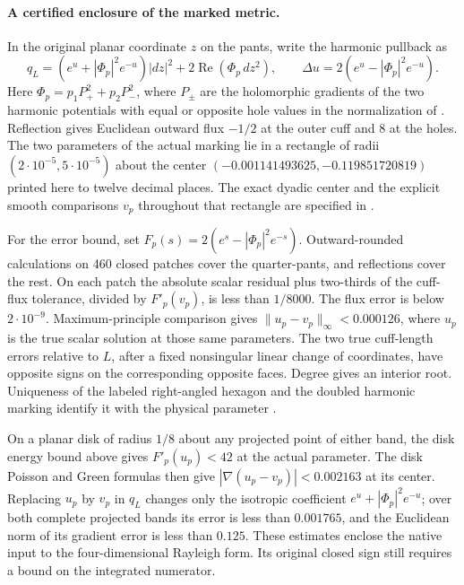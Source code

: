 \documentclass[11pt,letterpaper]{article}
\numberwithin{equation}{section}
\begin{document}
\paragraph{A certified enclosure of the marked metric.}
In the original planar coordinate \(z\) on the pants, write the
harmonic pullback as
\[
 q_L=(e^u+|\Phi_p|^2e^{-u})|dz|^2+2\operatorname{Re}(\Phi_p\,dz^2),
 \qquad \Delta u=2(e^u-|\Phi_p|^2e^{-u}).
\]
Here \(\Phi_p=p_1P_+^2+p_2P_-^2\), where \(P_\pm\) are the
holomorphic gradients of the two harmonic potentials with equal or
opposite hole values in the normalization of
\cite{Baker2026NativeMarking}. Reflection gives Euclidean outward
flux \(-1/2\) at the outer cuff and \(8\) at the holes.
The two parameters of the actual marking lie in a rectangle of
radii \((2\cdot10^{-5},5\cdot10^{-5})\) about the center
\((-0.001141493625,-0.119851720819)\) printed here to twelve decimal
places. The exact dyadic center and the explicit smooth comparisons
\(v_p\) throughout that rectangle are specified in
\cite{Baker2026NativeMarking}.

For the error bound, set \(F_p(s)=2(e^s-|\Phi_p|^2e^{-s})\).
Outward-rounded calculations on 460 closed patches cover the
quarter-pants, and reflections cover the rest. On each patch the
absolute scalar residual plus two-thirds of the cuff-flux tolerance,
divided by \(F'_p(v_p)\), is less than \(1/8000\). The flux error is
below \(2\cdot10^{-9}\). Maximum-principle comparison gives
\(\|u_p-v_p\|_\infty<0.000126\), where \(u_p\) is the true scalar
solution at those same parameters. The two true cuff-length errors
relative to \(L\), after a fixed nonsingular linear change of
coordinates, have opposite signs on the corresponding opposite faces.
Degree gives an interior root. Uniqueness of the labeled
right-angled hexagon and the doubled harmonic marking identify it
with the physical parameter \cite{Baker2026NativeMarking}.

On a planar disk of radius \(1/8\) about any projected point of
either band, the disk energy bound above gives \(F'_p(u_p)<42\)
at the actual parameter. The disk Poisson and Green formulas then
give \(|\nabla(u_p-v_p)|<0.002163\) at its center. Replacing \(u_p\)
by \(v_p\) in \(q_L\) changes only the isotropic coefficient
\(e^u+|\Phi_p|^2e^{-u}\); over both complete projected bands its
error is less than \(0.001765\), and the Euclidean norm of its
gradient error is less than \(0.125\). These estimates enclose the
native input to the four-dimensional Rayleigh form. Its original
closed sign still requires a bound on the integrated numerator.
\end{document}
